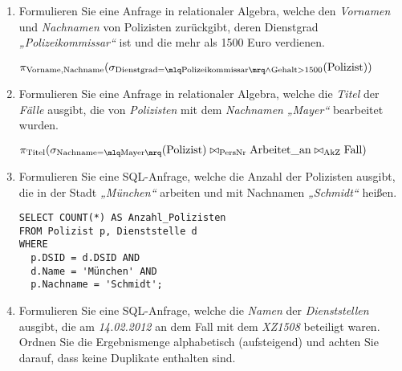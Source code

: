 \documentclass{lehramt-informatik-aufgabe}
\begin{document}
\begin{enumerate}


\item Formulieren Sie eine Anfrage in relationaler
Algebra, welche den \emph{Vornamen} und
\emph{Nachnamen} von Polizisten zurückgibt, deren Dienstgrad
\emph{„Polizeikommissar“} ist und die mehr als 1500 Euro verdienen.

\begin{antwort}
$\pi_{\text{Vorname,Nachname}}(
  \sigma_{
    \text{Dienstgrad} = \mlq \text{Polizeikommissar} \mrq
      \land
    \text{Gehalt} > 1500
  }(\text{Polizist})
)$
\end{antwort}


\item Formulieren Sie eine Anfrage in relationaler Algebra, welche die
\emph{Titel} der \emph{Fälle} ausgibt, die von \emph{Polizisten} mit dem
\emph{Nachnamen} \emph{„Mayer“} bearbeitet wurden.

\begin{antwort}
$
\pi_{\text{Titel}}(
  \sigma_{\text{Nachname} = \mlq \text{Mayer} \mrq}(\text{Polizist})
  \bowtie_{\text{PersNr}}
  \text{Arbeitet\_an}
  \bowtie_{\text{AkZ}}
  \text{Fall}
)
$
\end{antwort}


\item Formulieren Sie eine SQL-Anfrage, welche die Anzahl der
Polizisten ausgibt, die in der Stadt \emph{„München“} arbeiten und mit
Nachnamen \emph{„Schmidt“} heißen.

\begin{antwort}
\begin{verbatim}
SELECT COUNT(*) AS Anzahl_Polizisten
FROM Polizist p, Dienststelle d
WHERE
  p.DSID = d.DSID AND
  d.Name = 'München' AND
  p.Nachname = 'Schmidt';
\end{verbatim}
\end{antwort}


\item Formulieren Sie eine SQL-Anfrage, welche die \emph{Namen} der
\emph{Dienststellen} ausgibt, die am \emph{14.02.2012} an dem Fall mit
dem \emph{XZ1508} beteiligt waren. Ordnen Sie die Ergebnismenge
alphabetisch (aufsteigend) und achten Sie darauf, dass keine Duplikate
enthalten sind.


\end{enumerate}
\end{document}
